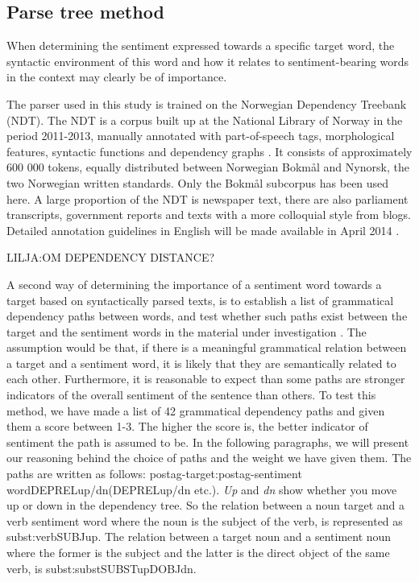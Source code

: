 \documentclass[11pt]{article}
\begin{document}
\subsection{Parse tree method}
\label{sec:dp}
When determining the sentiment expressed towards a specific target word, the syntactic environment of this word and how it relates to sentiment-bearing words in the context may clearly be of importance.

The parser used in this study is trained on the Norwegian Dependency Treebank (NDT). The NDT is a corpus built up at the National Library of Norway in the period 2011-2013, manually annotated with part-of-speech tags, morphological features, syntactic functions and dependency graphs \cite{Sol14, Sol13}. It consists of approximately 600 000 tokens, equally distributed between Norwegian Bokmål and Nynorsk, the two Norwegian written standards. Only the Bokmål subcorpus has been used here. A large proportion of the NDT is newspaper text, there are also parliament transcripts, government reports and texts with a more colloquial style from blogs. Detailed annotation guidelines in English will be made available in April 2014 \cite{Kinn2013}.

LILJA:OM DEPENDENCY DISTANCE?

A second way of determining the importance of a sentiment word towards a target based on syntactically parsed texts, is to establish a list of grammatical dependency paths between words, and test whether such paths exist between the target and the sentiment words in the material under investigation \cite{Jiang11}. The assumption would be that, if there is a meaningful grammatical relation between a target and a sentiment word, it is likely that they are semantically related to each other. Furthermore, it is reasonable to expect than some paths are stronger indicators of the overall sentiment of the sentence than others. To test this method, we have made a list of 42 grammatical dependency paths and given them a score between 1-3. The higher the score is, the better indicator of sentiment the path is assumed to be. In the following paragraphs, we will present our reasoning behind the choice of paths and the weight we have given them. The paths are written as follows: postag-target:postag-sentiment word{\textunderscore}{\textunderscore}DEPREL{\textunderscore}up/dn({\textunderscore}{\textunderscore}DEPREL{\textunderscore}up/dn etc.). \emph{Up} and \emph{dn} show whether you move up or down in the dependency tree. So the relation between a noun target and a verb sentiment word where the noun is the subject of the verb, is represented as subst:verb{\textunderscore}{\textunderscore}SUBJ{\textunderscore}up. The relation between a target noun and a sentiment noun where the former is the subject and the latter is the direct object of the same verb, is subst:subst{\textunderscore}{\textunderscore}SUBST{\textunderscore}up{\textunderscore}{\textunderscore}DOBJ{\textunderscore}dn.
\end{document}
